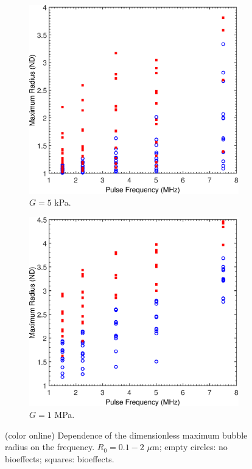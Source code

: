 \begin{figure}[t]
  \begin{subfigure}[b]{0.47\textwidth}
    \includegraphics[width=\textwidth]{./figs/bubble_figs/rstarmax_f_ca=20}
    \caption{$G=5$ kPa.}
  \end{subfigure}

  \begin{subfigure}[b]{0.47\textwidth}
    \includegraphics[width=\textwidth]{./figs/bubble_figs/rstarmax_f_ca=0,1}    
    \caption{$G=1$ MPa.}
  \end{subfigure}
  \caption{(color online) Dependence of the dimensionless maximum bubble radius on
     the frequency. $R_0=0.1-2$ $\mu$m; empty circles: no bioeffects; squares:
     bioeffects.}
  \label{figure:freq_tissue}
\end{figure}

